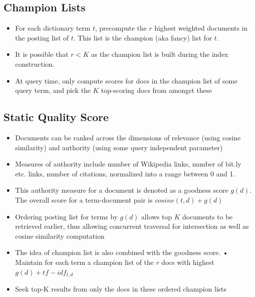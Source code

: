 \documentclass{article}
\begin{document}
\subsection{Champion Lists}
\begin{itemize}
    \item For each dictionary term $t$, precompute the $r$ highest weighted documents in the posting list of $t$. This list is the champion (aka fancy) list for $t$. 
    
    \item It is possible that $r<K$ as the champion list is built during the index construction.
    
    \item  At query time, only compute scores for docs in the champion list of some query term, and pick the $K$ top-scoring docs from amongst these
\end{itemize}

\subsection{Static Quality Score}
\begin{itemize}
    \item Documents can be ranked across the dimensions of relevance (using cosine similarity) and authority (using some query independent parameter)
    
    \item Measures of authority include number of Wikipedia links, number of bit.ly etc. links, number of citations, normalized into a range between 0 and 1. 
    
    \item This authority measure for a document is denoted as a goodness score $g(d)$. The overall score for a term-document pair is $cosine(t,d) + g(d)$
    
    \item Ordering posting list for terms by $g(d)$ allows top $K$ documents to be retrieved earlier, thus allowing concurrent traversal for intersection as well as cosine similarity computation
    
    \item The idea of champion list is also combined with the goodness score. • Maintain for each term a champion list of the $r$ docs with highest $g(d) + tf-idf_{t,d}$
    
    \item Seek top-K results from only the docs in these ordered champion lists
\end{itemize}
\end{document}
